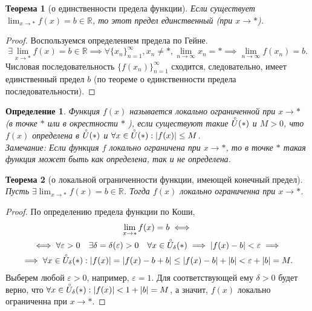\documentclass[a4paper,12pt]{article} %
\newtheorem{definition}{Определение}[section]
\newtheorem{theorem}{Теорема}[section]
\theoremstyle{remark}
\theoremstyle{definition}
\begin{document}
\begin{theorem}[о единственности предела функции]
	Если существует $\lim_{x \to *} f(x) = b \in  \mathbb{R}$, то этот предел единственный (при $x \to *$).
\end{theorem}
\begin{proof}
	Воспользуемся определением предела по Гейне.
	\[
	\exists  \lim_{x \to *} f(x) = b \in \mathbb{R} \implies \forall \{x_n\}_{n=1}^{\infty}, x_n \neq  *, \lim_{n \to \infty} x_n = * \implies \lim_{n \to \infty} f(x_n) = b
	.\] 
	 Числовая последовательность $\{f(x_n)\}_{n=1}^{\infty}$ сходится, следовательно, имеет единственный предел $b$ (по теореме о единственности предела последовательности). 
\end{proof}

\begin{definition}
	Функция $f(x)$ называется локально ограниченной при  $x \to *$ (в точке $*$ или в окрестности $*$ ), если существуют такие $\accentset{\circ}{U}(*)$ и $M>0$, что $f(x)$ определена в  $\accentset{\circ}{U}(*) $ и $\forall x\in \accentset{\circ}{U}(*) : |f(x)| \le  M$. \\
Замечание: Если функция $f$ локально ограничена при $x \to *$, то в точке $*$ такая функция может быть как определена, так и не определена.
\end{definition}


\begin{theorem}[о локальной ограниченности функции, имеющей конечный предел]
	Пусть $\exists \lim_{x \to *} f(x) = b \in \mathbb{R}$. Тогда $f(x)$ локально ограниченна при $x\to *$.
\end{theorem}
\begin{proof}
	По определению предела функции по Коши,
	\begin{multline}
	\lim_{x \to *} f(x)=b \iff \\
	\iff \forall \varepsilon> 0 \quad \exists \delta=\delta(\varepsilon)>0 \quad \forall x\in \accentset{\circ}{U}_\delta(*) \implies |f(x) - b| < \varepsilon \implies \\
	\implies \forall x\in \accentset{\circ}{U}_\delta(*) : |f(x)| = |f(x) -b + b| \le  |f(x) -b| + |b| < \varepsilon + |b| = M.
	\end{multline}
	Выберем любой $\varepsilon>0$, например, $\varepsilon=1$. Для соответствующей ему $\delta>0$ будет верно, что $\forall x\in \accentset{\circ}{U}_\delta(*) : |f(x)| < 1 + |b| = M$, а значит, $f(x)$ локально ограниченна при $x \to *$.
\end{proof}
\end{document}
